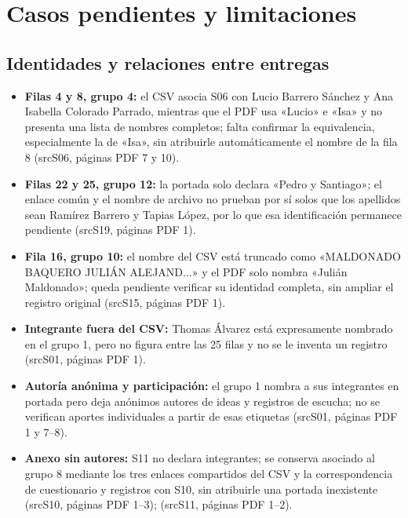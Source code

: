 \documentclass[11pt,a4paper]{article}
\newcommand{\evid}[2]{(\csname src#1\endcsname, páginas PDF #2)}
\begin{document}
\section*{Casos pendientes y limitaciones}
\subsection*{Identidades y relaciones entre entregas}
\begin{itemize}
\item \textbf{Filas 4 y 8, grupo 4:} el CSV asocia S06 con Lucio Barrero Sánchez y Ana Isabella Colorado Parrado, mientras que el PDF usa «Lucio» e «Isa» y no presenta una lista de nombres completos; falta confirmar la equivalencia, especialmente la de «Isa», sin atribuirle automáticamente el nombre de la fila 8 \evid{S06}{7 y 10}.
\item \textbf{Filas 22 y 25, grupo 12:} la portada solo declara «Pedro y Santiago»; el enlace común y el nombre de archivo no prueban por sí solos que los apellidos sean Ramírez Barrero y Tapias López, por lo que esa identificación permanece pendiente \evid{S19}{1}.
\item \textbf{Fila 16, grupo 10:} el nombre del CSV está truncado como «MALDONADO BAQUERO JULIÁN ALEJAND...» y el PDF solo nombra «Julián Maldonado»; queda pendiente verificar su identidad completa, sin ampliar el registro original \evid{S15}{1}.
\item \textbf{Integrante fuera del CSV:} Thomas Álvarez está expresamente nombrado en el grupo 1, pero no figura entre las 25 filas y no se le inventa un registro \evid{S01}{1}.
\item \textbf{Autoría anónima y participación:} el grupo 1 nombra a sus integrantes en portada pero deja anónimos autores de ideas y registros de escucha; no se verifican aportes individuales a partir de esas etiquetas \evid{S01}{1 y 7--8}.
\item \textbf{Anexo sin autores:} S11 no declara integrantes; se conserva asociado al grupo 8 mediante los tres enlaces compartidos del CSV y la correspondencia de cuestionario y registros con S10, sin atribuirle una portada inexistente \evid{S10}{1--3}; \evid{S11}{1--2}.
\end{itemize}
\end{document}
